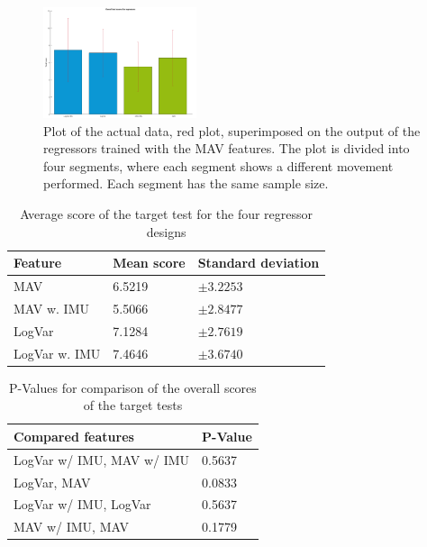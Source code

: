 	\begin{figure}[!thpb]
		\centering
		\includegraphics[width=0.4\textwidth]{figures/allRegressorBarzTimeScoreForTargetTest}  %
		\caption{Plot of the actual data, red plot, superimposed on the output of the regressors trained with the MAV features. The plot is divided into four segments, where each segment shows a different movement performed. Each segment has the same sample size.}
		\label{fig:TimeScoreTargets}  %
	\end{figure}
	
	\begin{table}[!thpb]
		\begin{center}
			\begin{tabular}{l l l}
				\hline
				\textbf{Feature} & \textbf{Mean score} & \textbf{Standard deviation}\\
				\hline
				MAV & 6.5219 & $\pm 3.2253$ \\
				MAV w. IMU & 5.5066 & $\pm 2.8477$ \\
				LogVar & 7.1284 & $\pm 2.7619$ \\
				LogVar w. IMU & 7.4646 & $\pm 3.6740$ \\
				\hline
			\end{tabular}
			\caption{Average score of the target test for the four regressor designs}
		\end{center}
	\end{table}
	
	\begin{table}[!thpb]
		\begin{center}
			\begin{tabular}{l l}
				\hline
				\textbf{Compared features} & \textbf{P-Value}\\
				\hline
				LogVar w/ IMU, MAV w/ IMU & 0.5637 \\
				LogVar, MAV & 0.0833 \\
				LogVar w/ IMU, LogVar & 0.5637 \\
				MAV w/ IMU, MAV & 0.1779 \\
				\hline
			\end{tabular}
			\caption{P-Values for comparison of the overall scores of the target tests}
		\end{center}
	\end{table}
	
